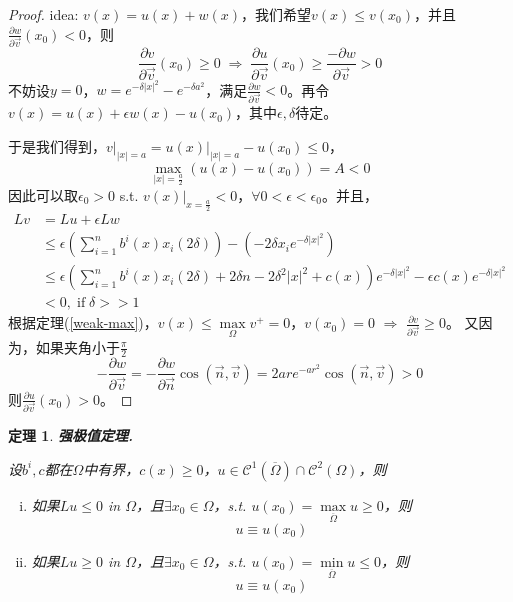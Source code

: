 \documentclass[11pt, a4paper]{article}
\theoremstyle{theorem}
\newtheorem{thm}{定理}[section]
\begin{document}
\begin{proof}
    idea: $v(x) = u(x) + w(x)$，我们希望$v(x) \leq v(x_0)$，并且$\frac{\partial w}{\partial \vec{v}}(x_0) < 0$，则
    $$
    \frac{\partial v}{\partial \vec{v}}(x_0) \geq 0 \; \Longrightarrow \; \frac{\partial u}{\partial \vec{v}}(x_0) \geq \frac{- \partial w}{\partial \vec{v}} > 0
    $$
    不妨设$y = 0$，$w = e^{- \delta |x|^2} - e^{-\delta a^2}$，满足$\frac{\partial w}{\partial \vec{v}} < 0$。再令$v(x) = u(x) + \epsilon w(x) - u(x_0)$，其中$\epsilon, \delta$待定。

    于是我们得到，$v \bigg|_{|x| = a} = u(x) \bigg|_{|x| = a} - u(x_0) \leq 0$，
    $$
    \max\limits_{|x| = \frac{a}{2}} (u(x) - u(x_0)) = A < 0
    $$
    因此可以取$\epsilon_0 > 0$ s.t. $v(x) \bigg|_{x = \frac{a}{2}} < 0$，$\forall 0 < \epsilon < \epsilon_0$。并且，
    \begin{align*}
        L v
        &= L u + \epsilon L w \\
        &\leq \epsilon \left(\sum_{i=1}^n b^i(x)x_i(2 \delta) \right) - \left(- 2\delta x_i e^{- \delta |x|^2}\right) \\
        &\leq \epsilon \left(\sum_{i=1}^n b^i(x)x_i(2 \delta) + 2\delta n - 2 \delta^2 |x|^2 + c(x)\right)e^{- \delta |x|^2} - \epsilon c(x) e^{- \delta |x|^2} \\
        &< 0, \; \text{if} \; \delta > > 1
    \end{align*}
    根据定理(\ref{weak-max})，$v(x) \leq \max\limits_{\Omega} v^+ = 0$，$v(x_0) = 0$ $\Rightarrow$ $\frac{\partial v}{\partial \vec{v}} \geq 0$。
    又因为，如果夹角小于$\frac{\pi}{2}$
    $$
    - \frac{\partial w}{\partial \vec{v}} = - \frac{\partial w}{\partial \vec{n}} \cos(\vec{n}, \vec{v}) = 2 a r e^{-ar^2} \cos(\vec{n}, \vec{v}) > 0
    $$
    则$\frac{\partial u}{\partial \vec{v}}(x_0) > 0$。
\end{proof}

\begin{thm} \textbf{强极值定理. }
\label{thm-strong-max}

设$b^i, c$都在$\Omega$中有界，$c(x) \geq 0$，$u \in \mathcal{C}^1(\overline{\Omega}) \cap \mathcal{C}^2(\Omega)$，则

\begin{enumerate}[(i)]
  \item 如果$L u \leq 0$ in $\Omega$，且$\exists x_0 \in \Omega$，s.t. $u(x_0) = \max\limits_{\overline{\Omega}} u \geq 0$，则
  $$
  u \equiv u(x_0)
  $$
  \item 如果$L u \geq 0$ in $\Omega$，且$\exists x_0 \in \Omega$，s.t. $u(x_0) = \min\limits_{\overline{\Omega}} u \leq 0$，则
  $$
  u \equiv u(x_0)
  $$
\end{enumerate}
\end{thm}
\end{document}
